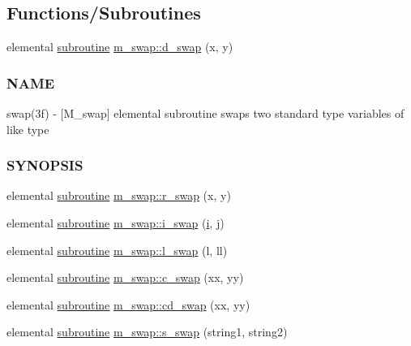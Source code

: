 \subsection*{Functions/\+Subroutines}
\begin{DoxyCompactItemize}
\item 
elemental \hyperlink{M__stopwatch_83_8txt_acfbcff50169d691ff02d4a123ed70482}{subroutine} \hyperlink{namespacem__swap_a73a5ecd37d14f30520e204bb906734c0}{m\+\_\+swap\+::d\+\_\+swap} (x, y)
\begin{DoxyCompactList}\small\item\em \subsubsection*{N\+A\+ME}

swap(3f) -\/ \mbox{[}M\+\_\+swap\mbox{]} elemental subroutine swaps two standard type variables of like type \subsubsection*{S\+Y\+N\+O\+P\+S\+IS}\end{DoxyCompactList}\item 
elemental \hyperlink{M__stopwatch_83_8txt_acfbcff50169d691ff02d4a123ed70482}{subroutine} \hyperlink{namespacem__swap_a8404b842cf10433585d21bddb67c0269}{m\+\_\+swap\+::r\+\_\+swap} (x, y)
\item 
elemental \hyperlink{M__stopwatch_83_8txt_acfbcff50169d691ff02d4a123ed70482}{subroutine} \hyperlink{namespacem__swap_ac8e4f4c4892b543c110823934032791f}{m\+\_\+swap\+::i\+\_\+swap} (\hyperlink{intro__blas1_83_8txt_a8ba82a50c0c2c12d5f6a77f7e4651c0b}{i}, \hyperlink{exit_87_8txt_a8921ef29c441e427867c54bd3b2462ba}{j})
\item 
elemental \hyperlink{M__stopwatch_83_8txt_acfbcff50169d691ff02d4a123ed70482}{subroutine} \hyperlink{namespacem__swap_a3d204834a7c6cea08aef9387c680a90e}{m\+\_\+swap\+::l\+\_\+swap} (l, ll)
\item 
elemental \hyperlink{M__stopwatch_83_8txt_acfbcff50169d691ff02d4a123ed70482}{subroutine} \hyperlink{namespacem__swap_a2353a772e3ac1242164631a9ec75f981}{m\+\_\+swap\+::c\+\_\+swap} (xx, yy)
\item 
elemental \hyperlink{M__stopwatch_83_8txt_acfbcff50169d691ff02d4a123ed70482}{subroutine} \hyperlink{namespacem__swap_a7961e38856c3c44276520f6543b609b7}{m\+\_\+swap\+::cd\+\_\+swap} (xx, yy)
\item 
elemental \hyperlink{M__stopwatch_83_8txt_acfbcff50169d691ff02d4a123ed70482}{subroutine} \hyperlink{namespacem__swap_a10156a985cf314b706164ec3f773bd0f}{m\+\_\+swap\+::s\+\_\+swap} (string1, string2)
\end{DoxyCompactItemize}
